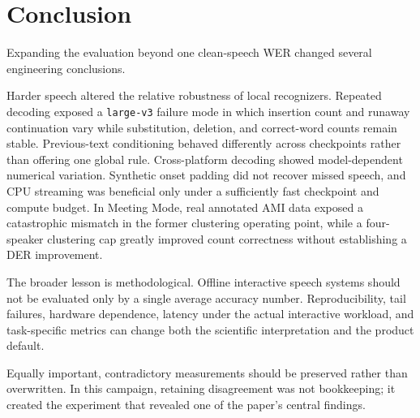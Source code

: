 \section{Conclusion}

Expanding the \YazSes{} evaluation beyond one clean-speech WER changed several engineering
conclusions.

Harder speech altered the relative robustness of local recognizers. Repeated decoding exposed a
\texttt{large-v3} failure mode in which insertion count and runaway continuation vary while
substitution, deletion, and correct-word counts remain stable. Previous-text conditioning
behaved differently across checkpoints rather than offering one global rule. Cross-platform
decoding showed model-dependent numerical variation. Synthetic onset padding did not recover
missed speech, and CPU streaming was beneficial only under a sufficiently fast checkpoint and
compute budget. In Meeting Mode, real annotated AMI data exposed a catastrophic mismatch in the
former clustering operating point, while a four-speaker clustering cap greatly improved count
correctness without establishing a DER improvement.

The broader lesson is methodological. Offline interactive speech systems should not be evaluated
only by a single average accuracy number. Reproducibility, tail failures, hardware dependence,
latency under the actual interactive workload, and task-specific metrics can change both the
scientific interpretation and the product default.

Equally important, contradictory measurements should be preserved rather than overwritten. In
this campaign, retaining disagreement was not bookkeeping; it created the experiment that
revealed one of the paper's central findings.